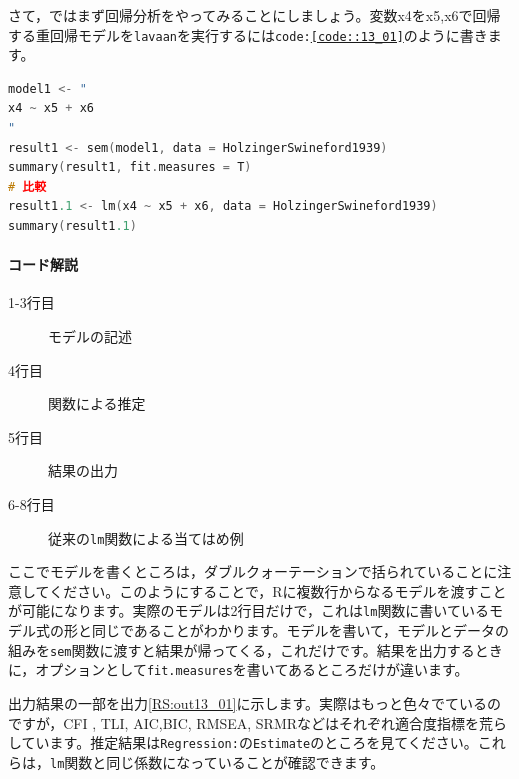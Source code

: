 \documentclass{ltjsbook}
\begin{document}
さて，ではまず回帰分析をやってみることにしましょう。変数x4をx5,x6で回帰する重回帰モデルを\texttt{lavaan}を実行するには\texttt{code:\ref{code::13_01}}のように書きます。

\begin{lstlisting}[language=c++,label={code::13_01},caption={重回帰モデル}]
model1 <- "
x4 ~ x5 + x6
"
result1 <- sem(model1, data = HolzingerSwineford1939)
summary(result1, fit.measures = T)
# 比較
result1.1 <- lm(x4 ~ x5 + x6, data = HolzingerSwineford1939)
summary(result1.1)
\end{lstlisting}

\paragraph{コード解説}
    \begin{description}
        \item[1-3行目] モデルの記述
        \item[4行目] 関数による推定
        \item[5行目] 結果の出力
        \item[6-8行目] 従来の\texttt{lm}関数による当てはめ例
\end{description}

ここでモデルを書くところは，ダブルクォーテーションで括られていることに注意してください。このようにすることで，Rに複数行からなるモデルを渡すことが可能になります。実際のモデルは2行目だけで，これは\texttt{lm}関数に書いているモデル式の形と同じであることがわかります。モデルを書いて，モデルとデータの組みを\texttt{sem}関数に渡すと結果が帰ってくる，これだけです。結果を出力するときに，オプションとして\texttt{fit.measures}を書いてあるところだけが違います。

出力結果の一部を出力\ref{RS:out13_01}に示します。実際はもっと色々でているのですが，CFI , TLI, AIC,BIC, RMSEA, SRMRなどはそれぞれ適合度指標を荒らしています。推定結果は\texttt{Regression:}の\texttt{Estimate}のところを見てください。これらは，\texttt{lm}関数と同じ係数になっていることが確認できます。
\end{document}
